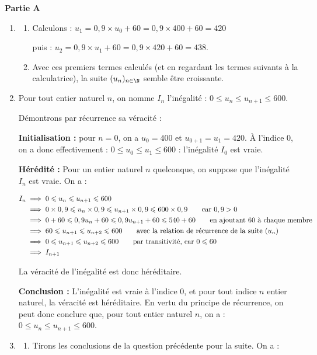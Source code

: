 
	\medskip

	\textbf{Partie A}

	\medskip


	\begin{enumerate}
	\item \begin{enumerate}
		\item Calculons : $u_1 = 0,9 \times u_0 + 60 = 0,9\times 400 + 60 = 420$

		puis : $u_2= 0,9 \times u_1 + 60 = 0,9\times 420 + 60 = 438$.
		\item Avec ces premiers termes calculés (et en regardant les termes suivants à la calculatrice), la suite $(u_n)_{n \in \N}$ semble être croissante.
		\end{enumerate}
	\item Pour tout entier naturel $n$, on nomme $I_n$ l'inégalité : \quad $0  \leqslant u_n  \leqslant u_{n+1} \leqslant  600$.

	Démontrons par récurrence sa véracité :

	\textbf{Initialisation :} pour $n = 0$, on a $u_0 = 400$ et $u_{0+1} = u_1 = 420$. À l'indice 0, on a donc effectivement : $0\leqslant u_0 \leqslant u_1 \leqslant 600 $ : l'inégalité $I_0$ est vraie.

	\smallskip
	\textbf{Hérédité :} Pour un entier naturel $n$ quelconque, on suppose que l'inégalité $I_n$ est vraie. On a :

$\aligned I_n &\implies 0  \leqslant u_n  \leqslant u_{n+1} \leqslant  600\\
		&\implies 0\times 0,9  \leqslant u_n \times 0,9 \leqslant u_{n+1}\times 0,9 \leqslant  600\times 0,9 \qquad \text{car }0,9>0\\
		&\implies 0 + 60  \leqslant 0,9u_n + 60 \leqslant 0,9u_{n+1} + 60 \leqslant  540 + 60 \qquad \text{en ajoutant 60 à chaque membre}\\
		&\implies 60 \leqslant u_{n + 1} \leqslant u_{n+2} \leqslant  600 \qquad \text{avec la relation de récurrence de la suite } (u_n)\\
		&\implies 0 \leqslant u_{n + 1} \leqslant u_{n+2} \leqslant  600 \qquad \text{par transitivité, car } 0 \leqslant 60\\
		&\implies I_{n+1} \\ \endaligned $

La véracité de l'inégalité est donc héréditaire.

\textbf{Conclusion :} L'inégalité est vraie à l'indice 0, et pour tout indice $n$ entier naturel, la véracité est héréditaire. En vertu du principe de récurrence, on peut donc conclure que, pour tout entier naturel $n$, on a : \quad $0  \leqslant u_n  \leqslant u_{n+1} \leqslant  600$.
	\item
		\begin{enumerate}
			\item Tirons les conclusions de la question précédente pour la suite. On a :


\end{enumerate}
\end{enumerate}
